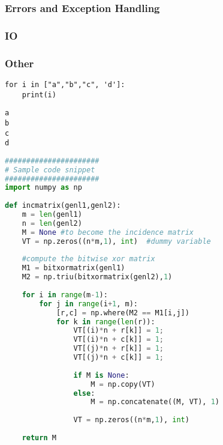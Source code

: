 \subsubsection{Errors and Exception Handling}

\subsubsection{IO}

\subsubsection{Other}

\begin{lstlisting}[style=pyInStyle]
for i in ["a","b","c", 'd']:
    print(i)
\end{lstlisting}

\begin{lstlisting}[style=pyOutStyle]
a
b
c
d
\end{lstlisting}

\begin{lstlisting}[language=Python]
######################
# Sample code snippet
######################
import numpy as np
 
def incmatrix(genl1,genl2):
    m = len(genl1)
    n = len(genl2)
    M = None #to become the incidence matrix
    VT = np.zeros((n*m,1), int)  #dummy variable
 
    #compute the bitwise xor matrix
    M1 = bitxormatrix(genl1)
    M2 = np.triu(bitxormatrix(genl2),1) 
 
    for i in range(m-1):
        for j in range(i+1, m):
            [r,c] = np.where(M2 == M1[i,j])
            for k in range(len(r)):
                VT[(i)*n + r[k]] = 1;
                VT[(i)*n + c[k]] = 1;
                VT[(j)*n + r[k]] = 1;
                VT[(j)*n + c[k]] = 1;
 
                if M is None:
                    M = np.copy(VT)
                else:
                    M = np.concatenate((M, VT), 1)
 
                VT = np.zeros((n*m,1), int)
 
    return M
\end{lstlisting}

